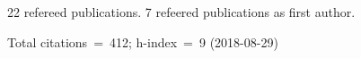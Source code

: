 22 refereed publications. 7 refeered publications as first author.

               Total citations~=~412; h-index~=~9 (2018-08-29)